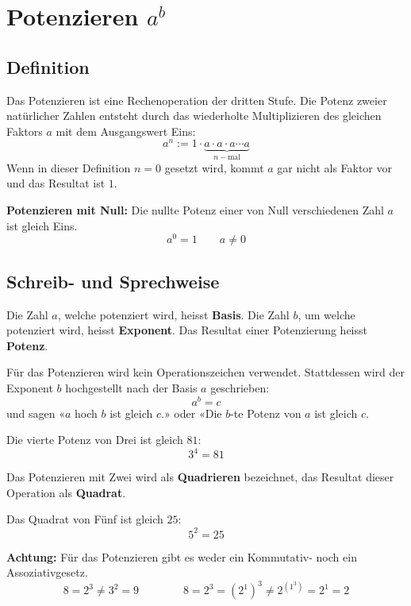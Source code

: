 \newpage
\section{Potenzieren $a^{b}$}

\subsection{Definition}

Das Potenzieren ist eine Rechenoperation der dritten Stufe. Die Potenz zweier natürlicher Zahlen entsteht durch das wiederholte Multiplizieren des gleichen Faktors $a$ mit dem Ausgangswert Eins:
\[
  a^{n} := 1\cdot\underbrace{a\cdot a\cdot a\cdots a}_{n-\text{mal}}
\]
Wenn in dieser Definition $n=0$ gesetzt wird, kommt $a$ gar nicht als Faktor vor und das Resultat ist $1$.
\begin{theorem}
  \textbf{Potenzieren mit Null:} Die nullte Potenz einer von Null verschiedenen Zahl $a$ ist gleich Eins.
  \[
    a^{0} = 1 \qquad a \ne 0
  \]
\end{theorem}

\subsection{Schreib- und Sprechweise}
Die Zahl $a$, welche potenziert wird, heisst \textbf{Basis}. Die Zahl $b$, um welche potenziert wird, heisst \textbf{Exponent}. Das Resultat einer Potenzierung heisst \textbf{Potenz}.

Für das Potenzieren wird kein Operationszeichen verwendet. Stattdessen wird der Exponent $b$ hochgestellt nach der Basis $a$ geschrieben:
\[
  a^{b} = c
\]
und sagen «$a$ hoch $b$ ist gleich $c$.» oder «Die $b$-te Potenz von $a$ ist gleich $c$.
\begin{example}
  Die vierte Potenz von Drei ist gleich $81$:
  \[
    3^{4} = 81
  \]
\end{example}
Das Potenzieren mit Zwei wird als \textbf{Quadrieren} bezeichnet, das Resultat dieser Operation als \textbf{Quadrat}.
\begin{example}
  Das Quadrat von Fünf ist gleich $25$:
  \[
    5^{2} = 25
  \]
\end{example}
\begin{note}
  \textbf{Achtung:} Für das Potenzieren gibt es weder ein Kommutativ- noch ein Assoziativgesetz.
  \[
    8 = 2^{3} \ne 3^{2} = 9 \qquad\qquad 8 = 2^{3} = \left(2^{1}\right)^{3} \ne 2^{(1^{3})} = 2^{1} = 2
  \]
\end{note}

